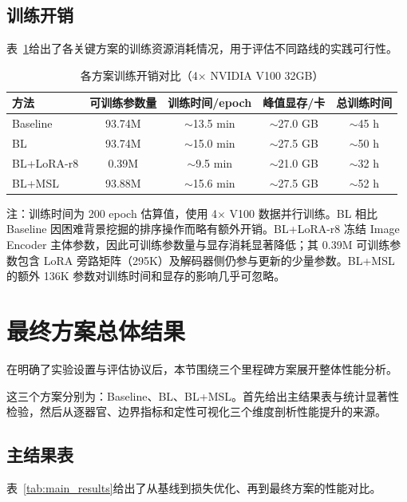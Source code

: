 \subsection{训练开销}

表~\ref{tab:training_overhead}给出了各关键方案的训练资源消耗情况，用于评估不同路线的实践可行性。

\begin{table}[htbp]
  \centering
  \caption{各方案训练开销对比（4$\times$ NVIDIA V100 32GB）}
  \label{tab:training_overhead}
  \small
  \begin{tabular}{lcccc}
    \hline
    方法 & 可训练参数量 & 训练时间/epoch & 峰值显存/卡 & 总训练时间 \\
    \hline
    Baseline    & 93.74M  & $\sim$13.5 min & $\sim$27.0 GB & $\sim$45 h \\
    BL          & 93.74M  & $\sim$15.0 min & $\sim$27.5 GB & $\sim$50 h \\
    BL+LoRA-r8  & 0.39M   & $\sim$9.5 min  & $\sim$21.0 GB & $\sim$32 h \\
    BL+MSL      & 93.88M  & $\sim$15.6 min & $\sim$27.5 GB & $\sim$52 h \\
    \hline
  \end{tabular}
  \vspace{2pt}
  \parbox{\textwidth}{\footnotesize 注：训练时间为 200 epoch 估算值，使用 4$\times$ V100 数据并行训练。BL 相比 Baseline 因困难背景挖掘的排序操作而略有额外开销。BL+LoRA-r8 冻结 Image Encoder 主体参数，因此可训练参数量与显存消耗显著降低；其 0.39M 可训练参数包含 LoRA 旁路矩阵（295K）及解码器侧仍参与更新的少量参数。BL+MSL 的额外 136K 参数对训练时间和显存的影响几乎可忽略。}
\end{table}

\section{最终方案总体结果}

在明确了实验设置与评估协议后，本节围绕三个里程碑方案展开整体性能分析。

这三个方案分别为：Baseline、BL、BL+MSL。首先给出主结果表与统计显著性检验，然后从逐器官、边界指标和定性可视化三个维度剖析性能提升的来源。

\subsection{主结果表}

表~\ref{tab:main_results}给出了从基线到损失优化、再到最终方案的性能对比。

